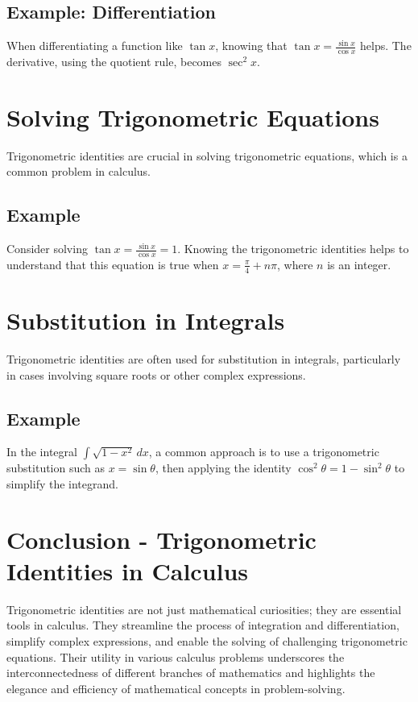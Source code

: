 \documentclass[a4paper,12pt]{book}
\newcounter{problem}
\begin{document}
\subsection*{Example: Differentiation}
When differentiating a function like $\tan x$, knowing that $\tan x = \frac{\sin x}{\cos x}$ helps. The derivative, using the quotient rule, becomes $\sec^2 x$.

\section{Solving Trigonometric Equations}
Trigonometric identities are crucial in solving trigonometric equations, which is a common problem in calculus.

\subsection*{Example}
Consider solving $\tan x = \frac{\sin x}{\cos x} = 1$. Knowing the trigonometric identities helps to understand that this equation is true when $x = \frac{\pi}{4} + n\pi$, where $n$ is an integer.

\section{Substitution in Integrals}
Trigonometric identities are often used for substitution in integrals, particularly in cases involving square roots or other complex expressions.

\subsection*{Example}
In the integral $\int \sqrt{1 - x^2} \, dx$, a common approach is to use a trigonometric substitution such as $x = \sin \theta$, then applying the identity $\cos^2 \theta = 1 - \sin^2 \theta$ to simplify the integrand.

\section{Conclusion - Trigonometric Identities in Calculus}
Trigonometric identities are not just mathematical curiosities; they are essential tools in calculus. They streamline the process of integration and differentiation, simplify complex expressions, and enable the solving of challenging trigonometric equations. Their utility in various calculus problems underscores the interconnectedness of different branches of mathematics and highlights the elegance and efficiency of mathematical concepts in problem-solving.
\end{document}
